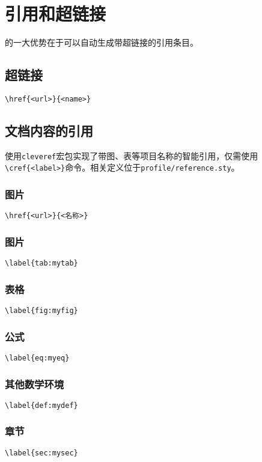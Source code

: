 \chapter{引用和超链接}
\label{chap:reference}

的一大优势在于可以自动生成带超链接的引用条目。

\section{超链接}

\lstinline|\href{<url>}{<name>}|

\section{文档内容的引用}

使用\lstinline|cleveref|宏包实现了带图、表等项目名称的智能引用，仅需使用\lstinline|\cref{<label>}|命令。相关定义位于\lstinline|profile/reference.sty|。

\subsection{图片}

\lstinline|\href{<url>}{<名称>}|

\subsection{图片}

\lstinline|\label{tab:mytab}|

\subsection{表格}

\lstinline|\label{fig:myfig}|

\subsection{公式}

\lstinline|\label{eq:myeq}|


\subsection{其他数学环境}

\lstinline|\label{def:mydef}|

\subsection{章节}


\lstinline|\label{sec:mysec}|
